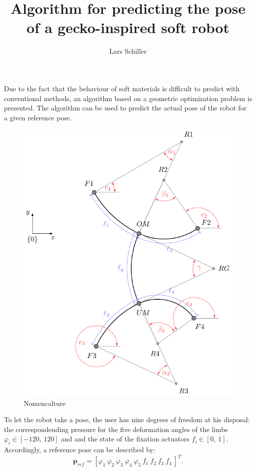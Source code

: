 \documentclass[10pt,a4paper]{article}
\author{Lars Schiller}
\title{Algorithm for predicting the pose of a gecko-inspired soft robot}
\begin{document}
\maketitle

Due to the fact that the behaviour of soft materials is difficult to predict with conventional methods, an algorithm based on a geometric optimization problem is presented.
The algorithm can be used to predict the actual pose of the robot for a given reference pose.

\begin{figure}
\includegraphics[scale=1]{../Pics/model/model.pdf}
\caption{Nomencalture}
\label{fig:model}
\end{figure}

To let the robot take a pose, the user has nine degrees of freedom at his disposal: the correspondending pressure for the five deformation angles of the limbs $\varphi_i \in [-120,~120]$ and 
and the state of the fixation actuators $f_i \in [0,~1]$.
Accordingly, a reference pose can be described by:
\begin{equation}
\bm{p}_{ref} = \left[ \varphi_1~\varphi_2~\varphi_3~\varphi_4~\varphi_5~f_1~f_2~f_3~f_4~ \right]^T.
\end{equation}
\end{document}
